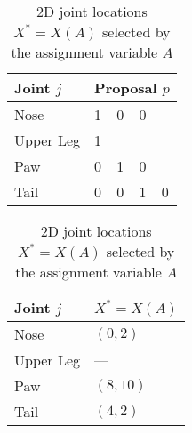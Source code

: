 \begin{table}
{{\begin{tabular}{@{}lllll@{}}
            \toprule
            Joint $j$ & \multicolumn{4}{l}{Proposal $p$}                                                 \\
            \midrule
            Nose      & 1 & 0                        & 0                        & \cellcolor[HTML]{808080} \\
            Upper Leg & 1 & \cellcolor[HTML]{808080} & \cellcolor[HTML]{808080} & \cellcolor[HTML]{808080} \\
            Paw       & 0 & 1                        & 0                        & \cellcolor[HTML]{808080} \\
            Tail      & 0 & 0                        & 1                        & 0                        \\
            \bottomrule
            \end{tabular}
            \caption{Assignment variables $A = \bvec a_j = \{a_{jp}\} \in \{0, 1\}^{N_j+1}$ for the current frame stored as a jagged array.}
            \label{tab:oja-proposals}
        }
        \bigskip
        \parbox{\linewidth}{
            \strut
            \centering
            \begin{tabular}{@{}ll@{}}
                \toprule
                Joint $j$ & $X^* = X(A)$ \\
                \midrule
                Nose      & $(0, 2)$     \\
                Upper Leg & ---          \\
                Paw       & $(8, 10)$    \\
                Tail      & $(4, 2)$     \\
                \bottomrule
            \end{tabular}
            \caption{2D joint locations $X^* = X(A)$ selected by the assignment variable $A$}
            \label{tab:oja-selected}
        }
    }
\end{table}        